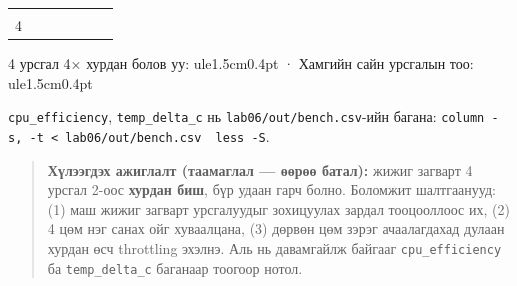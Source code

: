 \begin{longtable}[]{@{}lllllll@{}}
\begin{minipage}[t]{0.12\columnwidth}
\strut
\end{minipage} & \begin{minipage}[t]{0.12\columnwidth}\raggedright
\strut
\end{minipage} & \begin{minipage}[t]{0.12\columnwidth}\raggedright
\strut
\end{minipage} & \begin{minipage}[t]{0.12\columnwidth}\raggedright
\strut
\end{minipage} & \begin{minipage}[t]{0.12\columnwidth}\raggedright
\strut
\end{minipage} & \begin{minipage}[t]{0.12\columnwidth}\raggedright
\strut
\end{minipage}\tabularnewline
\begin{minipage}[t]{0.12\columnwidth}\raggedright
4\strut
\end{minipage} & \begin{minipage}[t]{0.12\columnwidth}\raggedright
\strut
\end{minipage} & \begin{minipage}[t]{0.12\columnwidth}\raggedright
\strut
\end{minipage} & \begin{minipage}[t]{0.12\columnwidth}\raggedright
\strut
\end{minipage} & \begin{minipage}[t]{0.12\columnwidth}\raggedright
\strut
\end{minipage} & \begin{minipage}[t]{0.12\columnwidth}\raggedright
\strut
\end{minipage} & \begin{minipage}[t]{0.12\columnwidth}\raggedright
\strut
\end{minipage}\tabularnewline
\bottomrule
\end{longtable}\endgroup

4 урсгал 4× хурдан болов уу: ule{1.5cm}{0.4pt} · Хамгийн сайн урсгалын тоо: ule{1.5cm}{0.4pt}

\texttt{cpu\_efficiency}, \texttt{temp\_\allowbreak{}delta\_\allowbreak{}c} нь \texttt{lab06/\allowbreak{}out/\allowbreak{}bench.\allowbreak{}csv}-ийн багана: \texttt{column\ -s,\ -t\ \textless{}\ lab06/out/bench.csv\ \textbar{}\ less\ -S}.

\begin{quote}
\textbf{Хүлээгдэх ажиглалт (таамаглал --- өөрөө батал):} жижиг загварт 4 урсгал 2-оос \textbf{хурдан биш}, бүр удаан гарч болно. Боломжит шалтгаанууд: (1) маш жижиг загварт урсгалуудыг зохицуулах зардал тооцооллоос их, (2) 4 цөм нэг санах ойг хуваалцана, (3) дөрвөн цөм зэрэг ачаалагдахад дулаан хурдан өсч throttling эхэлнэ. Аль нь давамгайлж байгааг \texttt{cpu\_efficiency} ба \texttt{temp\_\allowbreak{}delta\_\allowbreak{}c} баганаар тоогоор нотол.
\end{quote}

